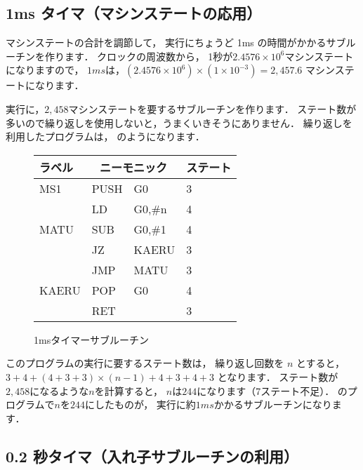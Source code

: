 \subsection{1ms タイマ（マシンステートの応用）}
\label{ms}

マシンステートの合計を調節して，
実行にちょうど 1ms の時間がかかるサブルーチンを作ります．
クロックの周波数から，
1秒が$2.4576 \times 10^{6}$マシンステートになりますので，
$1ms$は，$(2.4576 \times 10^{6}) \times (1 \times 10^{-3}) = 2,457.6$
マシンステートになります．

実行に，$2,458$マシンステートを要するサブルーチンを作ります．
ステート数が多いので繰り返しを使用しないと，うまくいきそうにありません．
繰り返しを利用したプログラムは，
のようになります．

\begin{figure}[btp]
{\small\tt\begin{center}
\begin{tabular}{|l|l l|l|} \hline
ラベル & \multicolumn{2}{|c|}{ニーモニック}& ステート \\
\hline
MS1   & PUSH & G0            & 3   \\
      & LD   & G0,\#n        & 4   \\
MATU  & SUB  & G0,\#1        & 4   \\
      & JZ   & KAERU         & 3   \\
      & JMP  & MATU          & 3   \\
KAERU & POP  & G0            & 4   \\
      & RET  &               & 3   \\
\hline
\end{tabular}
\end{center}}
\caption{1msタイマーサブルーチン}
\label{fig:chap6:1ms}
\end{figure}

このプログラムの実行に要するステート数は，
繰り返し回数を $n$ とすると，
$ 3 + 4 + ( 4 + 3 + 3 ) \times (n - 1) + 4 + 3 + 4 + 3$
となります．
ステート数が$2,458$になるような$n$を計算すると，
$n$は$244$になります（7ステート不足）．
のプログラムで$n$を$244$にしたものが，
実行に約$1ms$かかるサブルーチンになります．

\subsection{0.2 秒タイマ（入れ子サブルーチンの利用）}
\label{ms200}

